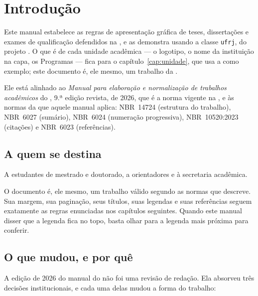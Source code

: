 \documentclass[dsc]{ufrj}
\begin{document}
  \listoffigures
  \listofframes
  \listofprograms
  \listofalgorithms
  \listoftables
  \printloabbreviations
  \printlosymbols
  \tableofcontents

  \mainmatter

  \chapter{Introdução}

  Este manual estabelece as regras de apresentação gráfica de teses,
  dissertações e exames de qualificação defendidos na , e as
  demonstra usando a classe \texttt{ufrj}, do projeto \CoppeTeX. O que é de
  cada unidade acadêmica ---
  o logotipo, o nome da instituição na capa, os Programas --- fica para o
  capítulo~\ref{cap:unidade}, que usa a  como exemplo; este
  documento é, ele mesmo, um trabalho da .

  Ele está alinhado ao \emph{Manual para elaboração e normalização de trabalhos
  acadêmicos} do , 9.ª edição revista, de 2026, que é a norma
  vigente na , e às normas da  que aquele manual aplica:
  \mbox{NBR~14724} (estrutura do trabalho), \mbox{NBR~6027} (sumário),
  \mbox{NBR~6024} (numeração progressiva), \mbox{NBR~10520:2023} (citações) e
  \mbox{NBR~6023} (referências).

  \section{A quem se destina}

  A estudantes de mestrado e doutorado, a orientadores e à secretaria acadêmica.

  O documento é, ele mesmo, um trabalho válido segundo as normas que descreve.
  Sua margem, sua paginação, seus títulos, suas legendas e suas referências
  seguem exatamente as regras enunciadas nos capítulos seguintes. Quando este
  manual disser que a legenda fica no topo, basta olhar para a legenda mais
  próxima para conferir.

  \section{O que mudou, e por quê}

  A edição de 2026 do manual do  não foi uma revisão de redação.
  Ela absorveu três decisões institucionais, e cada uma delas mudou a forma do
  trabalho:
\end{document}
